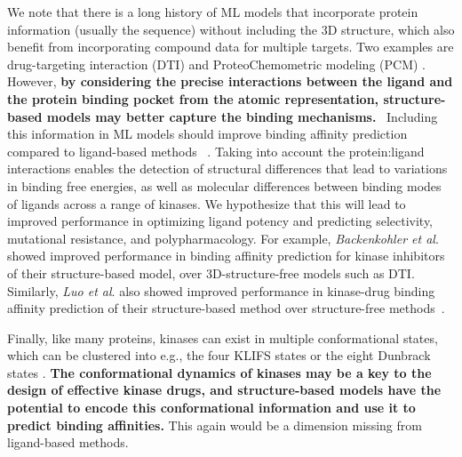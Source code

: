 \documentclass[9pt,lessons]{livecoms}
\begin{document}
We note that there is a long history of ML models that incorporate protein information (usually the sequence) without including the 3D structure, which also benefit from incorporating compound data for multiple targets. Two examples are drug-targeting interaction (DTI) and ProteoChemometric modeling (PCM) \cite{kimber2021deep, Backenkhler2023}.
However, \textbf{by considering the precise interactions between the ligand and the protein binding pocket from the atomic representation, structure-based models may better capture the binding mechanisms.}~\cite{sliwoski2014computational} Including this information in ML models should improve binding affinity prediction compared to ligand-based methods
~\cite{liu2023hybrid, schaller2023benchmarking}. Taking into account the protein:ligand interactions enables the detection of structural differences that lead to variations in binding free energies, as well as molecular differences between binding modes of ligands across a range of kinases. We hypothesize that this will lead to improved performance in optimizing ligand potency and predicting selectivity, mutational resistance, and polypharmacology. For example, \textit{Backenkohler et al}. ~\cite{backenkohler2023guided} showed improved performance in binding affinity prediction for kinase inhibitors of their structure-based model, over 3D-structure-free models such as DTI. Similarly, \textit{Luo et al}. also showed improved performance in kinase-drug binding affinity prediction of their structure-based method over structure-free methods~\cite{luo2023calibrated}.

Finally, like many proteins, kinases can exist in multiple conformational states, which can be clustered into e.g., the four KLIFS states \cite{Kanev2020} or the eight Dunbrack states \cite{modi2019defining, modi2022kincore}. \textbf{The conformational dynamics of kinases may be a key to the design of effective kinase drugs, and structure-based models have the potential to encode this conformational information and use it to predict binding affinities.} This again would be a dimension missing from ligand-based methods. 
\end{document}
